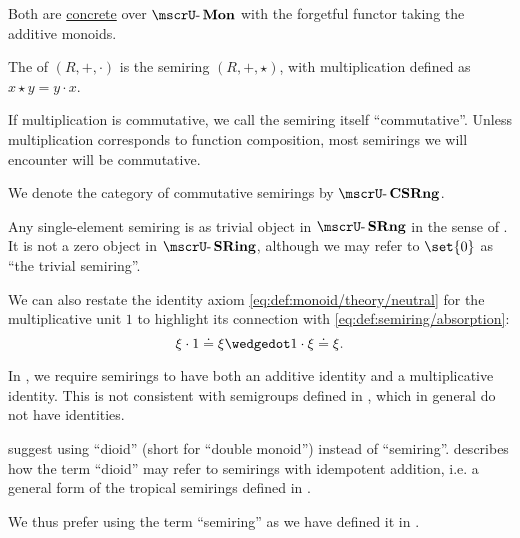 \begin{definition}
\begin{thmenum}
    Both are \hyperref[def:concrete_category]{concrete} over \hyperref[def:monoid/category]{\( \ucat{Mon} \)} with the forgetful functor taking the additive monoids.

     The  of \( (R, +, \cdot) \) is the semiring \( (R, +, \star) \), with multiplication defined as \( x \star y = y \cdot x \).

     If multiplication is commutative, we call the semiring itself \enquote{commutative}. Unless multiplication corresponds to function composition, most semirings we will encounter will be commutative.

    We denote the category of commutative semirings by \( \ucat{CSRng} \).

     Any single-element semiring is as trivial object in \( \ucat{SRng} \) in the sense of . It is not a zero object in \( \ucat{SRing} \), although we may refer to \( \set{ 0 } \) as \enquote{the trivial semiring}.
  \end{thmenum}
\end{definition}
\begin{comments}
  \item We can also restate the identity axiom \eqref{eq:def:monoid/theory/neutral} for the multiplicative unit \( 1 \) to highlight its connection with \eqref{eq:def:semiring/absorption}:
  \begin{equation}\label{eq:def:semiring/identity}
    \xi \cdot 1 \syneq \xi \synwedge 1 \cdot \xi \syneq \xi.
  \end{equation}
\end{comments}

\begin{remark}\label{rem:semiring_etymology}
  In , we require semirings to have both an additive identity and a multiplicative identity. This is not consistent with semigroups defined in , which in general do not have identities.

   suggest using \enquote{dioid} (short for \enquote{double monoid}) instead of \enquote{semiring}.  describes how the term \enquote{dioid} may refer to semirings with idempotent addition, i.e. a general form of the tropical semirings defined in .

  We thus prefer using the term \enquote{semiring} as we have defined it in .
\end{remark}

